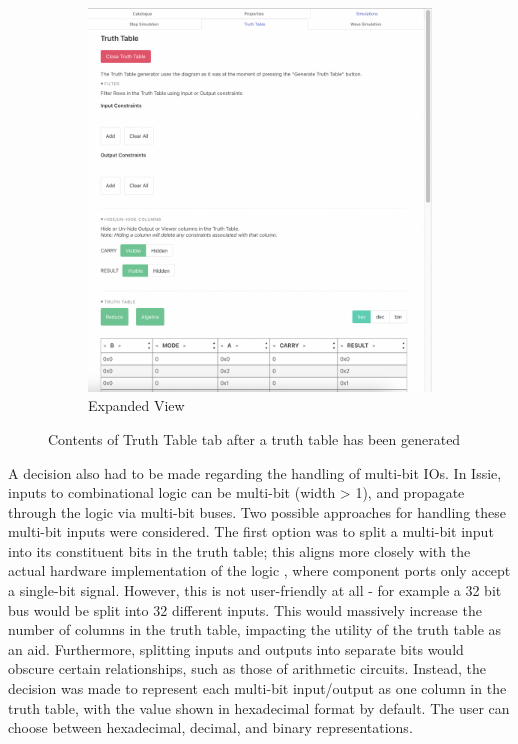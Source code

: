 \begin{figure}[h]
\begin{subfigure}[b]{0.48\textwidth}
         \includegraphics[width=\textwidth]{04.AnalysisDesign/expanded.png}
         \caption{Expanded View}
         \label{fig:expand}
     \end{subfigure}
        \caption{Contents of Truth Table tab after a truth table has been generated}
        \label{fig:tttab}
\end{figure}

A decision also had to be made regarding the handling of multi-bit IOs.
In Issie, inputs to combinational logic can be multi-bit (width > 1), and propagate through the logic via multi-bit buses. Two possible approaches for handling these multi-bit inputs were considered. The first option was to split a multi-bit input into its constituent bits in the truth table; this aligns more closely with the actual hardware implementation of the logic \cite{muxtables}, where component ports only accept a single-bit signal. However, this is not user-friendly at all - for example a 32 bit bus would be split into 32 different inputs. This would massively increase the number of columns in the truth table, impacting the utility of the truth table as an aid. Furthermore, splitting inputs and outputs into separate bits would obscure certain relationships, such as those of arithmetic circuits. Instead, the decision was made to represent each multi-bit input/output as one column in the truth table, with the value shown in hexadecimal format by default. The user can choose between hexadecimal, decimal, and binary representations.

